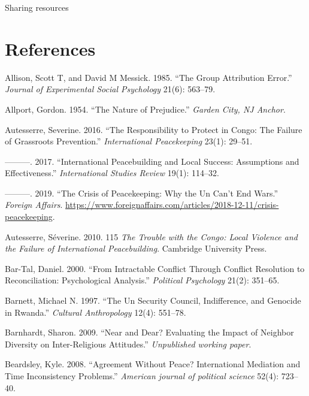 \documentclass[11pt]{article}
\begin{document}
Sharing resources

\section*{References}\label{references}

\hypertarget{refs}{}
\hypertarget{ref-allison1985group}{}
Allison, Scott T, and David M Messick. 1985. ``The Group Attribution
Error.'' \emph{Journal of Experimental Social Psychology} 21(6):
563--79.

\hypertarget{ref-allport1954prejudice}{}
Allport, Gordon. 1954. ``The Nature of Prejudice.'' \emph{Garden City,
NJ Anchor}.

\hypertarget{ref-autesserre2016failure}{}
Autesserre, Severine. 2016. ``The Responsibility to Protect in Congo:
The Failure of Grassroots Prevention.'' \emph{International
Peacekeeping} 23(1): 29--51.

\hypertarget{ref-autesserre2017international}{}
---------. 2017. ``International Peacebuilding and Local Success:
Assumptions and Effectiveness.'' \emph{International Studies Review}
19(1): 114--32.

\hypertarget{ref-autesserre2019crisis}{}
---------. 2019. ``The Crisis of Peacekeeping: Why the Un Can't End
Wars.'' \emph{Foreign Affairs}.
\url{https://www.foreignaffairs.com/articles/2018-12-11/crisis-peacekeeping}.

\hypertarget{ref-autesserre2010trouble}{}
Autesserre, Séverine. 2010. 115 \emph{The Trouble with the Congo: Local
Violence and the Failure of International Peacebuilding}. Cambridge
University Press.

\hypertarget{ref-bar2000intractable}{}
Bar-Tal, Daniel. 2000. ``From Intractable Conflict Through Conflict
Resolution to Reconciliation: Psychological Analysis.'' \emph{Political
Psychology} 21(2): 351--65.

\hypertarget{ref-barnett1997security}{}
Barnett, Michael N. 1997. ``The Un Security Council, Indifference, and
Genocide in Rwanda.'' \emph{Cultural Anthropology} 12(4): 551--78.

\hypertarget{ref-barnhardt2009near}{}
Barnhardt, Sharon. 2009. ``Near and Dear? Evaluating the Impact of
Neighbor Diversity on Inter-Religious Attitudes.'' \emph{Unpublished
working paper}.

\hypertarget{ref-beardsley2008agreement}{}
Beardsley, Kyle. 2008. ``Agreement Without Peace? International
Mediation and Time Inconsistency Problems.'' \emph{American journal of
political science} 52(4): 723--40.
\end{document}
